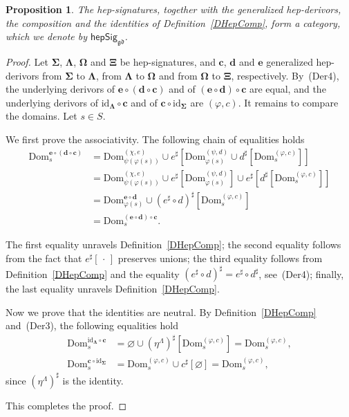 \documentclass[a4paper, reqno
]{amsart}
\newcommand{\sig}[1]{\mathbf{#1}}             %
\newcommand{\Dom}{\mathrm{Dom}}
\newcommand{\id}{\mathrm{id}}
\newcommand{\gd}{\mathfrak{gd}}              %
\theoremstyle{plain}
\newtheorem{proposition}[theorem]{Proposition}
\theoremstyle{definition}
\begin{document}
\begin{proposition}\label{PHepSigCat}
The hep-signatures, together with the generalized hep-derivors, the composition and the identities of Definition~\ref{DHepComp}, form a category, which we denote by $\mathsf{hepSig}_{\gd}$.
\end{proposition}
\begin{proof}
Let $\sig{\Sigma}$, $\sig{\Lambda}$, $\sig{\Omega}$ and $\sig{\Xi}$ be hep-signatures, and $\mathbf{c}$, $\mathbf{d}$ and $\mathbf{e}$ generalized hep-derivors from $\sig{\Sigma}$ to $\sig{\Lambda}$, from $\sig{\Lambda}$ to $\sig{\Omega}$ and from $\sig{\Omega}$ to $\sig{\Xi}$, respectively.
By~(Der4), the underlying derivors of $\mathbf{e}\circ(\mathbf{d}\circ\mathbf{c})$ and of $(\mathbf{e}\circ\mathbf{d})\circ\mathbf{c}$ are equal, and the underlying derivors of $\id_{\sig{\Lambda}}\circ\mathbf{c}$ and of $\mathbf{c}\circ\id_{\sig{\Sigma}}$ are $(\varphi,c)$.
It remains to compare the domains.
Let $s\in S$.

We first prove the associativity.
The following chain of equalities holds
\begin{align*}
\Dom^{\mathbf{e}\circ(\mathbf{d}\circ\mathbf{c})}_{s}
&=
\Dom^{(\chi,e)}_{\psi(\varphi(s))}\cup e^{\sharp}\left[\Dom^{(\psi,d)}_{\varphi(s)}\cup d^{\sharp}\left[\Dom^{(\varphi,c)}_{s}\right]\right]
\tag{1}
\\&=
\Dom^{(\chi,e)}_{\psi(\varphi(s))}\cup e^{\sharp}\left[\Dom^{(\psi,d)}_{\varphi(s)}\right]\cup e^{\sharp}\left[d^{\sharp}\left[\Dom^{(\varphi,c)}_{s}\right]\right]
\tag{2}
\\&=
\Dom^{\mathbf{e}\circ\mathbf{d}}_{\varphi(s)}\cup\left(e^{\sharp}\circ d\right)^{\sharp}\left[\Dom^{(\varphi,c)}_{s}\right]
\tag{3}
\\&=
\Dom^{(\mathbf{e}\circ\mathbf{d})\circ\mathbf{c}}_{s}.
\tag{4}
\end{align*}

The first equality unravels Definition~\ref{DHepComp}; the second equality follows from the fact that $e^{\sharp}[\,\cdot\,]$ preserves unions; the third equality follows from Definition~\ref{DHepComp} and the equality $(e^{\sharp}\circ d)^{\sharp}=e^{\sharp}\circ d^{\sharp}$, see~(Der4); finally, the last equality unravels Definition~\ref{DHepComp}.

Now we prove that the identities are neutral.
By Definition~\ref{DHepComp} and~(Der3), the following equalities hold
\begin{align*}
\Dom^{\id_{\sig{\Lambda}}\circ\mathbf{c}}_{s}
&=\varnothing\cup(\eta^{\Lambda})^{\sharp}\left[\Dom^{(\varphi,c)}_{s}\right]=\Dom^{(\varphi,c)}_{s},
\\
\Dom^{\mathbf{c}\circ\id_{\sig{\Sigma}}}_{s}
&=\Dom^{(\varphi,c)}_{s}\cup c^{\sharp}[\varnothing]=\Dom^{(\varphi,c)}_{s},
\end{align*}
since $(\eta^{\Lambda})^{\sharp}$ is the identity.

This completes the proof.
\end{proof}
\end{document}
